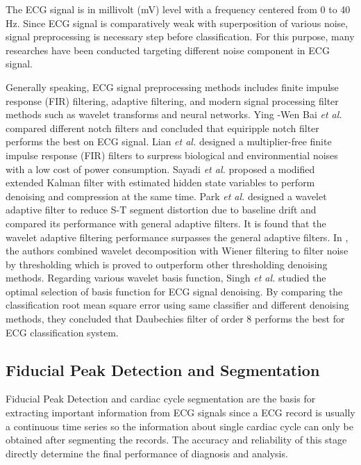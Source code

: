 The ECG signal is in millivolt (mV) level with a frequency centered from 0 to 40 Hz\cite{thakor1984estimation}. Since ECG signal is comparatively weak with superposition of various noise, signal preprocessing is necessary step before classification. For this purpose, many researches have been conducted targeting different noise component in ECG signal.

Generally speaking, ECG signal preprocessing methods includes finite impulse response (FIR) filtering,   adaptive filtering, and modern signal processing filter methods such as wavelet transforms and neural networks. Ying -Wen Bai \textit{et al.} compared different notch filters and concluded that equiripple notch filter performs the best on ECG signal. Lian \textit{et al.} \cite{lian2004ecg} designed a multiplier-free finite impulse response (FIR) filters to surpress biological and environmential noises with a low cost of power consumption. Sayadi \textit{et al.} \cite{Sayadi} proposed a modified extended Kalman filter with estimated hidden state variables to perform denoising and compression at the same time. Park \textit{et al.}\cite{21} designed a wavelet adaptive filter to reduce S-T segment distortion due to baseline drift and compared its performance with general adaptive filters. It is found that the wavelet adaptive filtering performance surpasses the general adaptive filters. In \cite{nikolaev2000wavelet}, the authors combined wavelet decomposition with Wiener filtering to filter noise by thresholding which is proved to outperform other thresholding denoising methods. Regarding various wavelet basis function, Singh \textit{et al.} studied the optimal selection of basis function for ECG signal denoising\cite{denoise}. By comparing the classification root mean square error using same classifier and different denoising methods, they concluded that Daubechies filter of order 8 performs the best for ECG classification system.


\subsection{Fiducial Peak Detection and Segmentation}

Fiducial Peak Detection and cardiac cycle segmentation are the basis for extracting important information from ECG signals since a ECG record is usually a continuous time series so the information about single cardiac cycle can only be obtained after segmenting the records. The accuracy and reliability of this stage directly determine the final performance of diagnosis and analysis. 


